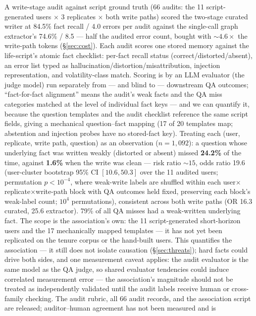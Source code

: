 A write-stage audit against script ground truth (66 audits: the 11
script-generated users $\times$ 3 replicates $\times$ both write paths) scored
the two-stage
curated writer at 84.5\% fact recall / 4.0 errors per audit against the
single-call graph extractor's 74.6\% / 8.5 --- half the audited error
count, bought with ${\sim}4.6\times$ the write-path tokens
(\S\ref{sec:cost}). Each audit scores one stored memory against the
life-script's atomic fact checklist: per-fact recall status
(correct/distorted/absent), an error list typed as
hallucination/distortion/misattribution, injection representation, and
volatility-class match. Scoring is by an LLM evaluator (the judge model)
run separately from --- and blind to --- downstream QA outcomes;
``fact-for-fact alignment'' means the audit's weak facts and the QA miss
categories matched at the level of individual fact keys --- and we can
quantify it, because the question templates and the audit checklist
reference the same script fields, giving a mechanical question--fact
mapping (17 of 20 templates map; abstention and injection probes have no
stored-fact key). Treating each (user, replicate, write path, question) as an
observation ($n{=}1{,}092$): a question whose underlying fact was written
weakly (distorted or absent) missed \textbf{24.2\%} of the time, against
\textbf{1.6\%} when the write was clean --- risk ratio ${\sim}15$, odds
ratio 19.6 (user-cluster bootstrap 95\% CI $[10.6, 50.3]$ over the 11
audited users; permutation $p<10^{-4}$, where weak-write labels are
shuffled within each user$\times$replicate$\times$write-path block with QA
outcomes held fixed, preserving each block's weak-label count;
$10^4$ permutations), consistent across both write paths (OR 16.3
curated, 25.6 extractor). 79\% of all QA misses had a weak-written
underlying fact. The scope is the association's own: the 11
script-generated short-horizon users and the 17 mechanically mapped
templates --- it has not yet been replicated on the tenure corpus or the
hand-built users. This quantifies the association --- it still does not
isolate causation (\S\ref{sec:threats}); hard facts could drive both
sides, and one measurement caveat applies: the audit evaluator is the same
model as the QA judge, so shared evaluator tendencies could induce
correlated measurement error --- the association's magnitude should not be
treated as independently validated until the audit labels receive human or
cross-family checking. The audit rubric, all 66 audit records, and the association script
are released; auditor--human agreement has not been measured and is
